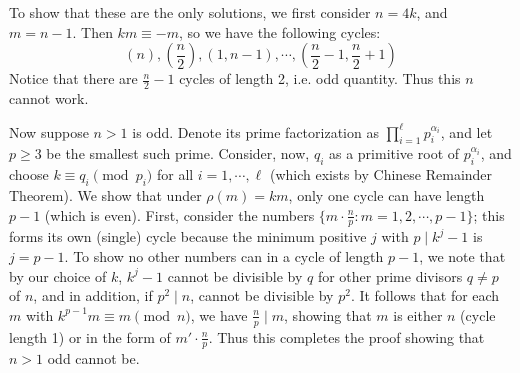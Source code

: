 \documentclass[11pt,a4paper]{article}
\begin{document}
\begin{enumerate}
		To show that these are the only solutions, 
		we first consider $n=4k$, and $m=n-1$. 
		Then $km\equiv -m$, 
		so we have the following cycles: 
		\[
		(n), (\frac{n}{2}), (1, n - 1), \cdots, (\frac{n}{2}-1, \frac{n}{2}+1)
		\]
		Notice that there are $\frac{n}{2}-1$ cycles of length 2, i.e. odd quantity. 
		Thus this $n$ cannot work. 
		
		Now suppose $n > 1$ is odd. 
		Denote its prime factorization as $\prod_{i=1}^{\ell} p_i^{\alpha_i}$, 
		and let $p\ge 3$ be the smallest such prime. 
		Consider, now, $q_i$ as a primitive root of $p_i^{\alpha_i}$, 
		and choose $k\equiv q_i\pmod{p_i}$ for all $i=1, \cdots, \ell$ 
		(which exists by Chinese Remainder Theorem). 
		We show that under $\rho(m)=km$, only one cycle can have length $p - 1$ (which is even). 
		First, consider the numbers 
		$\{m\cdot\frac{n}{p}: m=1, 2, \cdots, p - 1\}$; 
		this forms its own (single) cycle because the minimum positive $j$ with $p\mid k^j-1$ is $j = p - 1$. 
		To show no other numbers can in a cycle of length $p - 1$, 
		we note that by our choice of $k$, $k^j-1$ cannot be divisible by $q$ for other prime divisors $q\neq p$ of 
		$n$, and in addition, if $p^2\mid n$, cannot be divisible by $p^2$. 
		It follows that for each $m$ with $k^{p-1}m\equiv m\pmod{n}$, 
		we have $\frac{n}{p}\mid m$, 
		showing that $m$ is either $n$ (cycle length 1) or in the form of $m'\cdot\frac{n}{p}$. 
		Thus this completes the proof showing that $n > 1$ odd cannot be. 
	\end{enumerate}
\end{document}
